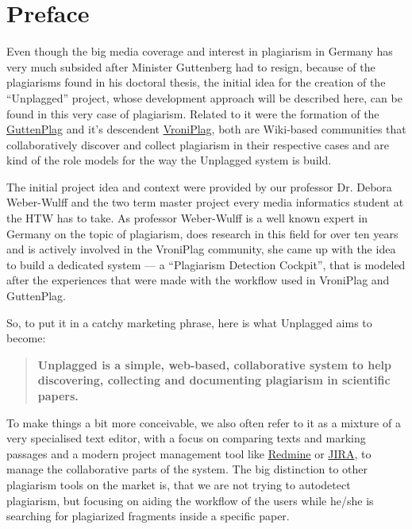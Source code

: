 \chapter{Preface}

Even though the big media coverage and interest in plagiarism in Germany has very much subsided\citep{Google2012} 
after Minister Guttenberg had to resign, because of the plagiarisms found in his doctoral thesis, the initial idea
for the 
creation of the \enquote{Unplagged} project, whose development approach will be described here, can be found in this 
very case of plagiarism. Related to it were the formation of the
\href{http://de.guttenplag.wikia.com/wiki/GuttenPlag\_Wiki}{GuttenPlag} and it's descendent 
\href{http://de.vroniplag.wikia.com/wiki/Home}{VroniPlag}, both are Wiki-based communities that collaboratively 
discover and collect plagiarism in their respective cases and are kind of the role models for the way the
Unplagged system is build.

The initial project idea and context were provided by our professor Dr. Debora Weber-Wulff and the two term master project
every media informatics student at the HTW has to take. As professor Weber-Wulff is a well known expert in Germany on the
topic of plagiarism,
does research in this field for over ten years\citep{Spiegel-Online2011} and is actively involved in the VroniPlag
community, she came up with the idea to build a dedicated system --- a \enquote{Plagiarism Detection Cockpit}\citep{Weber-Wulff2011}, 
that is modeled after the experiences that were made
with the workflow used in VroniPlag and GuttenPlag.


So, to put it in a catchy marketing phrase, here is what Unplagged aims to become: 

\begin{quote}
\textbf{Unplagged is a simple, web-based, collaborative system to help discovering, collecting and 
documenting plagiarism in scientific papers.}
\end{quote}

To make things a bit more conceivable, we also often refer to it as a mixture of a very specialised text editor, with a focus on 
comparing texts and marking 
passages and a modern project management tool like \href{http://www.redmine.org/}{Redmine} or 
\href{http://www.atlassian.com/JIRA}{JIRA}, 
to manage the collaborative parts of the system. The big distinction to other plagiarism tools on the market is, that we are not 
trying to autodetect plagiarism, but focusing on aiding the workflow of the users while he/she is searching for plagiarized
fragments inside a specific paper.

